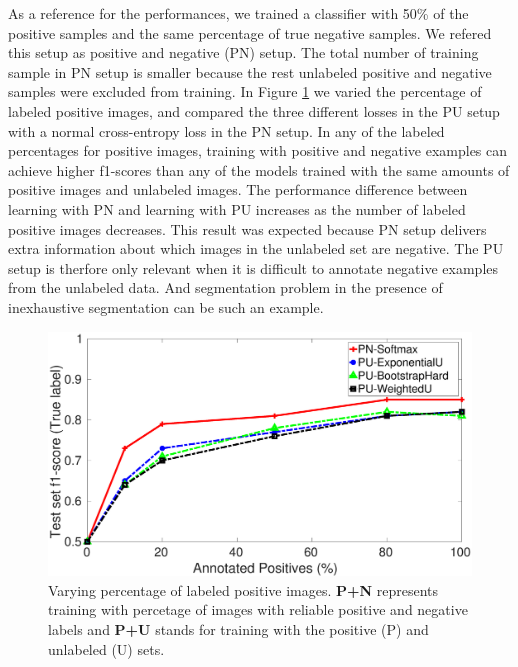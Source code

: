\noindent
As a reference for the performances, we trained a classifier with 50\% of the positive samples and the same percentage of true negative samples.
We refered this setup as positive and negative (PN) setup.
The total number of training sample in PN setup is smaller because the rest unlabeled positive and negative samples were excluded from training.
In Figure \ref{fig:pct_annotating} we varied the percentage of labeled positive images, and compared the three different losses in the PU setup with a normal cross-entropy loss in the PN setup.
In any of the labeled percentages for positive images, training with positive and negative examples can achieve higher f1-scores than any of the models trained with the same amounts of positive images and unlabeled images.
The performance difference between learning with PN and learning with PU increases as the number of labeled positive images decreases.
This result was expected because PN setup delivers extra information about which images in the unlabeled set are negative.
The PU setup is therfore only relevant when it is difficult to annotate negative examples from the unlabeled data.
And segmentation problem in the presence of inexhaustive segmentation can be such an example.

\begin{figure}[t]
\centering
   \includegraphics[width=\linewidth]{img/pu_vs_pn}
\caption{Varying percentage of labeled positive images. \textbf{P+N} represents training with percetage of images with reliable positive and negative labels and \textbf{P+U} stands for training with the positive (P) and unlabeled (U) sets.}
\label{fig:pct_annotating}
\end{figure}

